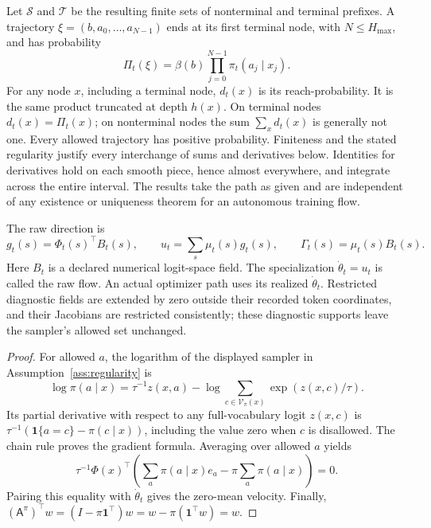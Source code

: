 Let $\mathcal S$ and $\mathcal T$ be the resulting finite sets of nonterminal and terminal prefixes. A trajectory $\xi=(b,a_0,\ldots,a_{N-1})$ ends at its first terminal node, with $N\le H_{\max}$, and has probability
\[
 \Pi_t(\xi)=\beta(b)\prod_{j=0}^{N-1}\pi_t(a_j\mid x_j).
\]
For any node $x$, including a terminal node, $d_t(x)$ is its reach-probability. It is the same product truncated at depth $h(x)$. On terminal nodes $d_t(x)=\Pi_t(x)$; on nonterminal nodes the sum $\sum_xd_t(x)$ is generally not one. Every allowed trajectory has positive probability. Finiteness and the stated regularity justify every interchange of sums and derivatives below. Identities for derivatives hold on each smooth piece, hence almost everywhere, and integrate across the entire interval. The results take the path as given and are independent of any existence or uniqueness theorem for an autonomous training flow.

The raw direction is
\[
 g_t(s)=\Phi_t(s)^\top B_t(s),\qquad
 u_t=\sum_s\mu_t(s)g_t(s),\qquad \Gamma_t(s)=\mu_t(s)B_t(s).
\]
Here $B_t$ is a declared numerical logit-space field. The specialization $\dot\theta_t=u_t$ is called the raw flow. An actual optimizer path uses its realized $\dot\theta_t$. Restricted diagnostic fields are extended by zero outside their recorded token coordinates, and their Jacobians are restricted consistently; these diagnostic supports leave the sampler's allowed set unchanged.

\begin{proof}
For allowed $a$, the logarithm of the displayed sampler in Assumption~\ref{ass:regularity} is
\[
 \log\pi(a\mid x)=\tau^{-1}z(x,a)
 -\log\sum_{c\in\mathcal V_\pi(x)}\exp(z(x,c)/\tau).
\]
Its partial derivative with respect to any full-vocabulary logit $z(x,c)$ is $\tau^{-1}(\mathbf1\{a=c\}-\pi(c\mid x))$, including the value zero when $c$ is disallowed. The chain rule proves the gradient formula. Averaging over allowed $a$ yields
\[
 \tau^{-1}\Phi(x)^\top\left(\sum_a\pi(a\mid x)e_a
                 -\pi\sum_a\pi(a\mid x)\right)=0.
\]
Pairing this equality with $\dot\theta_t$ gives the zero-mean velocity. Finally,
$(\mathsf A^\pi)^\top w=(I-\pi\mathbf1^\top)w=w-\pi(\mathbf1^\top w)=w$.
\end{proof}

